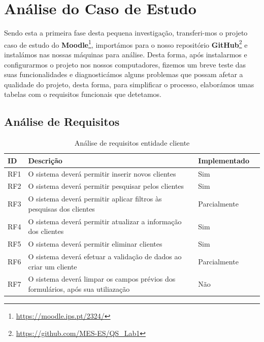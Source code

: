 \documentclass[a4paper,12pt]{article} %
\begin{document}
\newpage
\section{Análise do Caso de Estudo}
Sendo esta a primeira fase desta pequena investigação, transferi-mos o projeto caso de estudo do \textbf{Moodle}\footnote{\url{https://moodle.ips.pt/2324/}}, importámos para o nosso repositório \textbf{GitHub}\footnote{\url{https://github.com/MES-ES/QS_Lab1}} e instalámos nas nossas máquinas para análise. Desta forma, após instalarmos e configurarmos o projeto nos nossos computadores, fizemos um breve teste das suas funcionalidades e diagnosticámos alguns problemas que possam afetar a qualidade do projeto, desta forma, para simplificar o processo, elaborámos umas tabelas com o requisitos funcionais que detetamos.

\subsection{Análise de Requisitos}
\begin{table}[H]
	\centering
	\begin{tabular}{|l|p{12cm}|l|r|}
		\hline
		\textbf{ID} & \textbf{Descrição} & \textbf{Implementado}\\
		\hline
		RF1 & O sistema deverá permitir inserir novos clientes & Sim \\
		\hline
		RF2 & O sistema deverá permitir pesquisar pelos clientes & Sim \\
		\hline
		RF3 & O sistema deverá permitir aplicar filtros às pesquisas dos clientes & Parcialmente\footnotemark \\
		\hline
		RF4 & O sistema deverá permitir atualizar a informação dos clientes & Sim \\
		\hline
		RF5 & O sistema deverá permitir eliminar clientes & Sim \\
		\hline
		RF6 & O sistema deverá efetuar a validação de dados ao criar um cliente & Parcialmente\footnotemark \\
		\hline
		RF7 & O sistema deverá limpar os campos prévios dos formulários, após sua utiliazação & Não \\
		\hline
	\end{tabular}
	\caption{Análise de requisitos entidade cliente}
\end{table}
\end{document}
